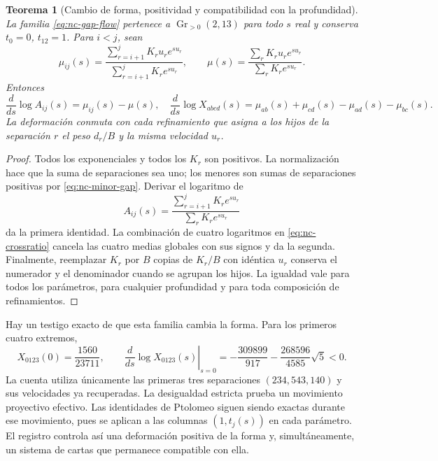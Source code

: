 \documentclass[a4paper,10pt]{article}
\newtheorem{theorem}{Teorema}[section]
\theoremstyle{definition}\newtheorem{definition}[theorem]{Definición}
\theoremstyle{remark}\newtheorem{remark}[theorem]{Observación}
\numberwithin{equation}{section}
\begin{document}
\begin{theorem}[Cambio de forma, positividad y compatibilidad con la profundidad]
\label{thm:nc-shape-flow}
La familia \eqref{eq:nc-gap-flow} pertenece a
\(\operatorname{Gr}_{>0}(2,13)\) para todo \(s\) real y conserva
\(t_0=0\), \(t_{12}=1\). Para \(i<j\), sean
\[
 \mu_{ij}(s)=
 \frac{\sum_{r=i+1}^jK_ru_re^{su_r}}{\sum_{r=i+1}^jK_re^{su_r}},
 \qquad
 \mu(s)=\frac{\sum_rK_ru_re^{su_r}}{\sum_rK_re^{su_r}}.
\]
Entonces
\begin{equation}
 \frac{d}{ds}\log A_{ij}(s)=\mu_{ij}(s)-\mu(s),
 \quad
 \frac{d}{ds}\log X_{abcd}(s)
 =\mu_{ab}(s)+\mu_{cd}(s)-\mu_{ad}(s)-\mu_{bc}(s).
 \label{eq:nc-crossratio-derivative}
\end{equation}
La deformación conmuta con cada refinamiento que asigna a los hijos de la
separación \(r\) el peso \(d_r/B\) y la misma velocidad \(u_r\).
\end{theorem}
\begin{proof}
Todos los exponenciales y todos los \(K_r\) son positivos. La normalización
hace que la suma de separaciones sea uno; los menores son sumas de
separaciones positivas por \eqref{eq:nc-minor-gap}. Derivar el logaritmo de
\[
 A_{ij}(s)=\frac{\sum_{r=i+1}^jK_re^{su_r}}
                      {\sum_rK_re^{su_r}}
\]
da la primera identidad. La combinación de cuatro logaritmos en
\eqref{eq:nc-crossratio} cancela las cuatro medias globales con sus signos
y da la segunda. Finalmente, reemplazar \(K_r\) por \(B\) copias de
\(K_r/B\) con idéntica \(u_r\) conserva el numerador y el denominador
cuando se agrupan los hijos. La igualdad vale para todos los parámetros,
para cualquier profundidad y para toda composición de refinamientos.
\end{proof}

Hay un testigo exacto de que esta familia cambia la forma. Para los primeros
cuatro extremos,
\begin{equation}
 X_{0123}(0)=\frac{1560}{23711},\qquad
 \left.\frac{d}{ds}\log X_{0123}(s)\right|_{s=0}
 =-\frac{309899}{917}-\frac{268596}{4585}\sqrt5<0.
 \label{eq:nc-nontrivial-witness}
\end{equation}
La cuenta utiliza únicamente las primeras tres separaciones
\((234,543,140)\) y sus velocidades ya recuperadas. La desigualdad
estricta prueba un movimiento proyectivo efectivo. Las identidades de
Ptolomeo siguen siendo exactas durante ese movimiento, pues se aplican a
las columnas \((1,t_j(s))\) en cada parámetro. El registro controla así
una deformación positiva de la forma y, simultáneamente, un sistema de
cartas que permanece compatible con ella.
\end{document}
